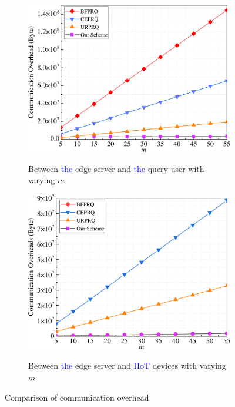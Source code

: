 \documentclass[IEEE JOURNAL OF BIOMEDICAL AND HEALTH INFORMATICS]{IEEEtran}
\begin{document}
{\begin{figure}
	\quad
	\begin{subfigure}[t]{0.23\textwidth}
		\centering
		\includegraphics[width=1\textwidth]{commu_1m}\\
		\caption{Between \textcolor{blue}{the} edge server and \textcolor{blue}{the} query user with varying $m$}\label{commu_1m}	
	\end{subfigure}
	\quad
	\begin{subfigure}[t]{0.23\textwidth}
		\centering
		\includegraphics[width=1\textwidth]{commu_3m}\\
		\caption{Between \textcolor{blue}{the} edge server and \textcolor{blue}{IIoT} devices with varying $m$}\label{commu_3m}
	\end{subfigure}
	\caption{Comparison of communication overhead }\label{communication}
\end{figure}

}
\end{document}
